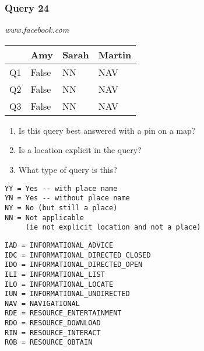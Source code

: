 \begin{frame}[fragile]
\frametitle{Query 24}
\vspace{1em}

\emph{www.facebook.com}

\vfill

\begin{table}
  \centering
  \begin{tabular}{ l l l l }
    & \textbf{Amy} & \textbf{Sarah} & \textbf{Martin}\\
    \toprule
    Q1 & False & NN & NAV\\
Q2 & False & NN & NAV\\
Q3 & False & NN & NAV\\
    \bottomrule
  \end{tabular}
\end{table}

\vfill

\tiny{

\begin{enumerate}
\item Is this query best answered with a pin on a map?
\item Is a location explicit in the query?
\item What type of query is this?
\end{enumerate}

\vfill

\begin{multicols}{2}
\begin{verbatim}
YY = Yes -- with place name
YN = Yes -- without place name
NY = No (but still a place)
NN = Not applicable 
     (ie not explicit location and not a place)
\end{verbatim}

\columnbreak
\begin{verbatim}
IAD = INFORMATIONAL_ADVICE
IDC = INFORMATIONAL_DIRECTED_CLOSED
IDO = INFORMATIONAL_DIRECTED_OPEN
ILI = INFORMATIONAL_LIST
ILO = INFORMATIONAL_LOCATE
IUN = INFORMATIONAL_UNDIRECTED
NAV = NAVIGATIONAL
RDE = RESOURCE_ENTERTAINMENT
RDO = RESOURCE_DOWNLOAD
RIN = RESOURCE_INTERACT
ROB = RESOURCE_OBTAIN
\end{verbatim}
\end{multicols}
}

\end{frame}



